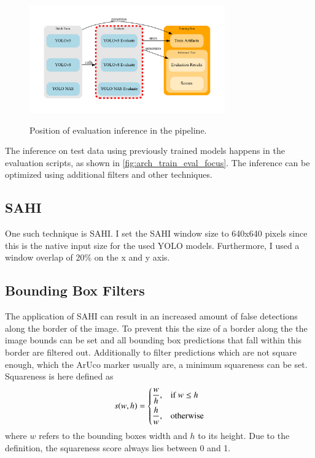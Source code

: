 \documentclass[10pt]{book}
\newcommand{\figureref}[1]{\autoref{#1}}
\begin{document}
\begin{figure}
  \caption{Position of evaluation inference in the pipeline.}
  \includegraphics[width=0.75\textwidth]{graph/arch_train_eval_focus}
  \label{fig:arch_train_eval_focus}
\end{figure}

The inference on test data using previously trained models happens in the evaluation scripts, as shown in \figureref{fig:arch_train_eval_focus}. The inference can be optimized using additional filters and other techniques. 

\subsection{SAHI}

One such technique is \ac{SAHI}. 
I set the \ac{SAHI} window size to 640x640 pixels since this is the native input size for the used \ac{YOLO} models. Furthermore, I used a window overlap of 20\% on the x and y axis.

\subsection{Bounding Box Filters}

The application of \ac{SAHI} can result in an increased amount of false detections along the border of the image. To prevent this the size of a border along the the image bounds can be set and all bounding box predictions that fall within this border are filtered out. Additionally to filter predictions which are not square enough, which the \ac{ArUco} marker usually are, a minimum squareness can be set. Squareness is here defined as $$ 
s(w,h)=
\begin{dcases}
    \frac{w}{h}, & \text{if } w\leq h\\
    \frac{h}{w}, & \text{otherwise}
\end{dcases} $$ where $w$ refers to the bounding boxes width and $h$ to its height. Due to the definition, the squareness score always lies between 0 and 1.
\end{document}
